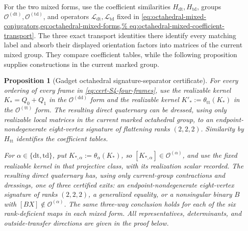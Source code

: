 \documentclass[11pt,letterpaper,onecolumn]{article}
\theoremstyle{plain}
\newtheorem{proposition}[proposition]{Proposition}
\theoremstyle{definition}
\theoremstyle{remark}
\newcommand{\OctDD}{{\mathcal O^{(\mathrm{dd})}}}
\newcommand{\OctTT}{{\mathcal O^{(\mathrm{tt})}}}
\newcommand{\OctDT}{{\mathcal O^{(\mathrm{dt})}}}
\newcommand{\OctTD}{{\mathcal O^{(\mathrm{td})}}}
\newcommand{\OctForm}[1]{{\mathcal O^{(#1)}}}
\begin{document}
For the two mixed forms, use the coefficient similarities
\(H_{\mathrm{dt}},H_{\mathrm{td}}\), groups \(\OctDT,\OctTD\), and
operators \(\mathcal L_{\mathrm{dt}},\mathcal L_{\mathrm{td}}\) fixed in
\cref{eq:octahedral-mixed-conjugators,eq:octahedral-mixed-forms,%
eq:octahedral-mixed-coefficient-transport}.  The three exact transport
identities there identify every matching label and absorb their displayed
orientation factors into matrices of the current mixed group.  They
compare coefficient tables, while the following proposition supplies
constructions in the current marked group.

\begin{proposition}[Gadget octahedral signature-separator certificate]
\label{prop:p1-cert-S4-uniform-eight-vertex-separator}
For every ordering of every frame in
\cref{eq:cert-S4-four-frames}, use the realizable kernel
\(K_*=Q_0+Q_1\) in the \(\OctDD\) form and the realizable kernel
\(K'_*:=\theta_{\mathrm{tt}}(K_*)\) in the \(\OctTT\) form.  The
resulting direct quaternary can be dressed, using only realizable local
matrices in the current marked octahedral group, to an endpoint-nondegenerate eight-vertex signature of
flattening ranks \((2,2,2)\).  Similarity by \(H_{\mathrm{tt}}\) identifies the coefficient tables.

For \(\alpha\in\{\mathrm{dt},\mathrm{td}\}\), put
\(K_{*,\alpha}:=\theta_\alpha(K_*)\), so
\([K_{*,\alpha}]\in\OctForm{\alpha}\), and use the fixed realizable kernel in
that projective class, with its realization scalar recorded.  The resulting
direct quaternary has, using only current-group contractions and
dressings, one of three certified exits: an endpoint-nondegenerate
eight-vertex signature of ranks \((2,2,2)\), a generalized equality,
or a nonsingular binary \(B\) with \([BX]\notin\OctForm{\alpha}\).
The same three-way conclusion holds for each of the six rank-deficient maps in
each mixed form.  All representatives, determinants, and outside-transfer
directions are given in the proof below.
\end{proposition}
\end{document}
